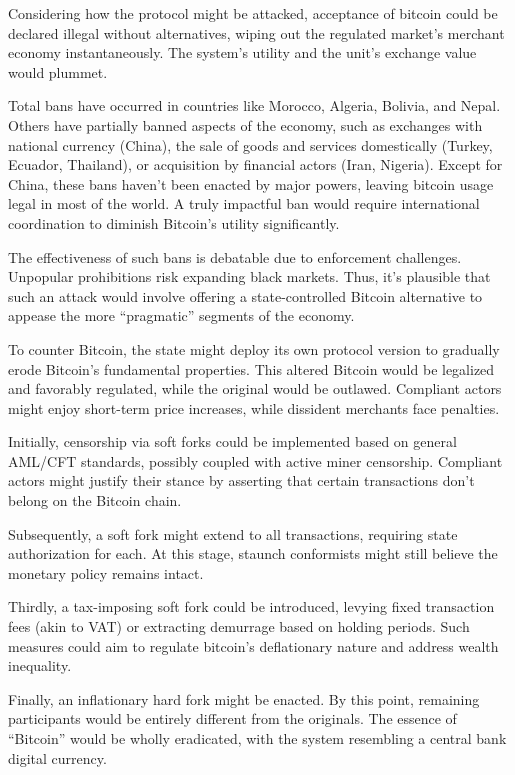 \documentclass[
  a5paper,
  smalldemyvopaper,10pt,twoside,onecolumn,openright,extrafontsizes,hidelinks]{memoir}
\begin{document}
Considering how the protocol might be attacked, acceptance of bitcoin
could be declared illegal without alternatives, wiping out the regulated
market's merchant economy instantaneously. The system's utility and the
unit's exchange value would plummet.

Total bans have occurred in countries like Morocco, Algeria, Bolivia,
and Nepal. Others have partially banned aspects of the economy, such as
exchanges with national currency (China), the sale of goods and services
domestically (Turkey, Ecuador, Thailand), or acquisition by financial
actors (Iran, Nigeria). Except for China, these bans haven't been
enacted by major powers, leaving bitcoin usage legal in most of the
world. A truly impactful ban would require international coordination to
diminish Bitcoin's utility significantly.

The effectiveness of such bans is debatable due to enforcement
challenges. Unpopular prohibitions risk expanding black markets. Thus,
it's plausible that such an attack would involve offering a
state-controlled Bitcoin alternative to appease the more ``pragmatic''
segments of the economy.

To counter Bitcoin, the state might deploy its own protocol version to
gradually erode Bitcoin's fundamental properties. This altered Bitcoin
would be legalized and favorably regulated, while the original would be
outlawed. Compliant actors might enjoy short-term price increases, while
dissident merchants face penalties.

Initially, censorship via soft forks could be implemented based on
general AML/CFT standards, possibly coupled with active miner
censorship. Compliant actors might justify their stance by asserting
that certain transactions don't belong on the Bitcoin chain.

Subsequently, a soft fork might extend to all transactions, requiring
state authorization for each. At this stage, staunch conformists might
still believe the monetary policy remains intact.

Thirdly, a tax-imposing soft fork could be introduced, levying fixed
transaction fees (akin to VAT) or extracting demurrage based on holding
periods. Such measures could aim to regulate bitcoin's deflationary
nature and address wealth inequality.

Finally, an inflationary hard fork might be enacted. By this point,
remaining participants would be entirely different from the originals.
The essence of ``Bitcoin'' would be wholly eradicated, with the system
resembling a central bank digital currency.
\end{document}
